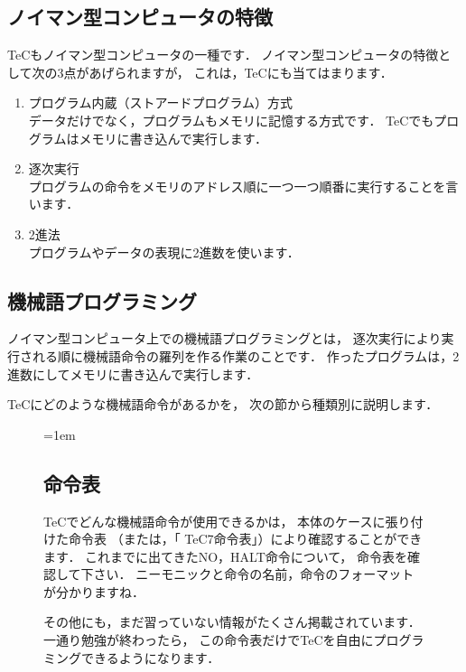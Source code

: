 \subsection{ノイマン型コンピュータの特徴}
TeCもノイマン型コンピュータの一種です．
ノイマン型コンピュータの特徴として次の3点があげられますが，
これは，TeCにも当てはまります．
\begin{enumerate}
\item プログラム内蔵（ストアードプログラム）方式 \\
  データだけでなく，プログラムもメモリに記憶する方式です．
  TeCでもプログラムはメモリに書き込んで実行します．
\item 逐次実行 \\
  プログラムの命令をメモリのアドレス順に一つ一つ順番に実行することを言います．
\item 2進法 \\
  プログラムやデータの表現に2進数を使います．
\end{enumerate}

\subsection{機械語プログラミング}
ノイマン型コンピュータ上での機械語プログラミングとは，
逐次実行により実行される順に機械語命令の羅列を作る作業のことです．
作ったプログラムは，2進数にしてメモリに書き込んで実行します．

TeCにどのような機械語命令があるかを，
次の節から種類別に説明します．

\begin{figure}[btp]
  \begin{framed}{\parindent=1em
      \subsection*{命令表}
      TeCでどんな機械語命令が使用できるかは，
      本体のケースに張り付けた命令表
      （または，「 TeC7命令表」）により確認することができます．
      これまでに出てきたNO，HALT命令について，
      命令表を確認して下さい．
      ニーモニックと命令の名前，命令のフォーマットが分かりますね．

      その他にも，まだ習っていない情報がたくさん掲載されています．
      一通り勉強が終わったら，
      この命令表だけでTeCを自由にプログラミングできるようになります．
  }\end{framed}
\end{figure}

